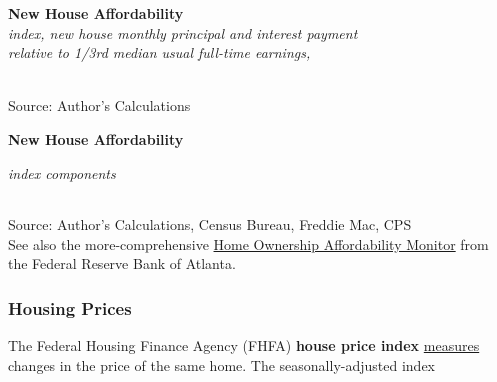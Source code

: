 \documentclass{report}
\makeatletter
\newcommand{\tbllink}[1]{\href{https://raw.githubusercontent.com/bdecon/US-chartbook/master/chartbook/data/#1}{\faTable}}
\newcommand*\short[1]{\expandafter\@gobbletwo\number\numexpr#1\relax}
\newcommand{\absnode}[3]{\node[below right, align=left] at (axis cs: #1,#2) {#3};}
\newcommand{\shdateaxisticks}{
		date coordinates in=x, axis line style={draw=none},
		xmax={2022-10-31},
		max space between ticks=40,	    
		xtick={{1990-01-01}, {1995-01-01}, {2000-01-01}, 
			{2005-01-01}, {2010-01-01}, {2015-01-01}, {2020-01-01}},
		minor xtick={},
		enlarge y limits={0.06}, enlarge x limits={0.01},
		}
\newcommand{\dbar}[2]{extra #1 ticks = {{#2}}, extra #1 tick labels = ,
		extra #1 tick style = {grid=major, grid style={dashed, thick, black!50}},}
\newcommand{\thinline}[4]{\addplot[no markers, color=#1] 
		table [x=#2, y=#3, col sep=comma] {#4};	}
\newcommand{\rbars}{
		\fill[color=black!10] (axis cs:{1990-07-01},\pgfkeysvalueof{/pgfplots/ymin}) rectangle 
			(axis cs:{1991-03-01}, \pgfkeysvalueof{/pgfplots/ymax});
		\fill[color=black!10] (axis cs:{2007-12-01},\pgfkeysvalueof{/pgfplots/ymin}) rectangle 
			(axis cs:{2009-07-01}, \pgfkeysvalueof{/pgfplots/ymax});
		\fill[color=black!10] (axis cs:{2001-03-01},\pgfkeysvalueof{/pgfplots/ymin}) rectangle 
			(axis cs:{2001-11-01}, \pgfkeysvalueof{/pgfplots/ymax});
		\fill[color=black!10] (axis cs:{2020-02-01},\pgfkeysvalueof{/pgfplots/ymin}) rectangle 
			(axis cs:{2020-05-01}, \pgfkeysvalueof{/pgfplots/ymax});}
\makeatother
\begin{document}
{\begin{minipage}{0.76\textwidth}
\begin{minipage}{0.575\textwidth}
\normalsize{\textbf{New House Affordability}}\\
\footnotesize{\textit{index, new house monthly principal and interest payment}}\\
\footnotesize{\textit{relative to 1/3rd median usual full-time earnings,}}\\
\hspace*{-2mm} \\
\footnotesize{Source: Author's Calculations} \hfill \tbllink{nha.csv}
\end{minipage} \hfill
\begin{minipage}{0.375\textwidth}
\small  
\end{minipage}
\vspace{3mm}

\normalsize \textbf{New House Affordability}\\
\footnotesize{\textit{index components}\\
\hspace*{-2mm}  \setlength{\tabcolsep}{2.0pt} \color{black!90}
		{\renewcommand{\arraystretch}{1.54}
\begin{tabular}{p{37mm} R{11mm} R{12mm} R{12mm} R{12mm}
		 		 R{12mm} R{12mm}}
			  \hline
		\end{tabular}}}

\vspace{-2mm}		
\footnotesize{Source: Author's Calculations, Census Bureau, Freddie Mac, CPS} \hfill \tbllink{nha_ts.csv} \\
\footnotesize{See also the more-comprehensive \href{https://www.atlantafed.org/center-for-housing-and-policy/data-and-tools/home-ownership-affordability-monitor}{Home Ownership Affordability Monitor} from the Federal Reserve Bank of Atlanta.}
\end{minipage}
\newpage
\subsubsection*{Housing Prices}
\begin{minipage}{0.76\textwidth}
\small The Federal Housing Finance Agency (FHFA) \textbf{house price index} \href{https://www.fhfa.gov/DataTools/Downloads/Pages/House-Price-Index-Datasets.aspx}{measures} changes in the price of the same home. The seasonally-adjusted index 


\end{minipage}}
\end{document}
